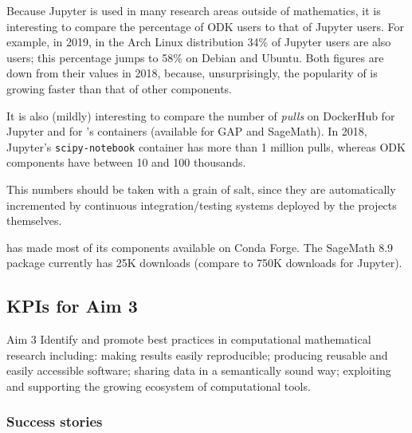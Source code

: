 \begin{enumerate}
  Because Jupyter is used in many research areas outside of
  mathematics, it is interesting to compare the percentage of ODK
  users to that of Jupyter users. For example, in 2019, in the Arch
  Linux distribution 34\% of Jupyter users are also \ODK users; this
  percentage jumps to 58\% on Debian and Ubuntu. Both figures are down
  from their values in 2018, because, unsurprisingly, the popularity
  of \Jupyter is growing faster than that of other \ODK components.
  
  \noindent
  It is also (mildly) interesting to compare the number of
  \emph{pulls} on DockerHub for Jupyter and for \ODK's containers
  (available for GAP and SageMath). In 2018, Jupyter's
  \texttt{scipy-notebook} container has more than 1 million pulls,
  whereas ODK components have between 10 and 100 thousands.

  \noindent
  This numbers should be taken with a grain of salt, since they are
  automatically incremented by continuous integration/testing systems
  deployed by the projects themselves.

  \noindent
  \ODK has made most of its components available on Conda Forge. The
  SageMath 8.9 package currently has 25K downloads (compare to 750K
  downloads for Jupyter).
\end{enumerate}

\subsection{KPIs for Aim 3}

\begin{recommendation}{Aim 3}
  Identify and promote best practices in computational mathematical research including: making results easily reproducible; producing
  reusable and easily accessible software; sharing data in a semantically sound way; exploiting and supporting the growing
  ecosystem of computational tools.
\end{recommendation}

\subsubsection{Success stories}

